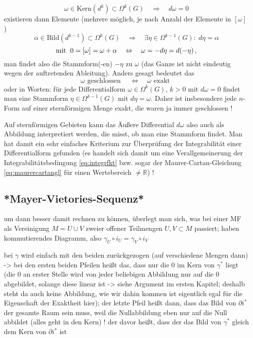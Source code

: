 \documentclass[../H_Analysis_main.tex]{subfiles}
\begin{document}
\begin{equation*}
\omega \in \text{Kern}(d^k) \subset \Omega^k(G) \quad \Rightarrow \quad d\omega = 0
\end{equation*}
existieren dann Elemente (mehrere möglich, je nach Anzahl der Elemente in $[\omega]$)
\begin{equation*}
\alpha \in \text{Bild}(d^{k - 1}) \subset \Omega^k(G) \quad \Rightarrow \quad \exists \eta \in \Omega^{k - 1}(G): \; d\eta = \alpha
\end{equation*}
\begin{equation*}
\text{mit } \; 0 = [\omega] = \omega + \alpha \quad \Leftrightarrow \quad \omega = -d\eta = d\qty(-\eta) \, ,
\end{equation*}
man findet also die Stammform(-en) $-\eta$ zu $\omega$ (das Ganze ist nicht eindeutig wegen der auftretenden Ableitung). Anders gesagt bedeutet das
\begin{equation}
\omega \text{ geschlossen } \quad \Leftrightarrow \quad \omega \text{ exakt }
\end{equation}
oder in Worten: für jede Differentialform $\omega \in \Omega^k(G), \, k > 0$ mit $d\omega = 0$ findet man eine Stammform $\eta \in \Omega^{k - 1}(G)$ mit $d\eta = \omega$. Daher ist insbesondere jede $n$-Form auf einer sternförmigen Menge exakt, die waren ja immer geschlossen !

Auf sternförmigen Gebieten kann das Äußere Differential $d\omega$ also auch als Abbildung interpretiert werden, die misst, ob man eine Stammform findet. Man hat damit ein sehr einfaches Kriterium zur Überprüfung der Integrabilität einer Differentialform gefunden (es handelt sich damit um eine Verallgemeinerung der Integrabilitätsbedingung \eqref{eq:integrfkt} bzw. sogar der Maurer-Cartan-Gleichung \eqref{eq:maurercartangl} für einen Wertebereich $\neq \mathbb{R}$) !



		\subsection{*Mayer-Vietories-Sequenz*}
um dann besser damit rechnen zu können, überlegt man sich, was bei einer MF als Vereinigung $M = U \cup V$ zweier offener Teilmengen $U, V \subset M$ passiert; haben kommutierendes Diagramm, also $\gamma_U \circ i_U = \gamma_V \circ i_V$

bei $\gamma$ wird einfach mit den beiden zurückgezogen (auf verschiedene Mengen dann) -> bei den ersten beiden Pfeilen heißt das, dass nur die 0 im Kern von $\gamma^*$ liegt (die 0 an erster Stelle wird von jeder beliebigen Abbildung nur auf die 0 abgebildet, solange diese linear ist -> siehe Argument im ersten Kapitel; deshalb steht da auch keine Abbildung, wie wir dahin kommen ist eigentlich egal für die Eigenschaft der Exaktheit hier); der letzte Pfeil heißt dann, dass das Bild von $\partial i^*$ der gesamte Raum sein muss, weil die Nullabbildung eben nur auf die Null abbildet (alles geht in den Kern) ! der davor heißt, dass der das Bild von $\gamma^*$ gleich dem Kern von $\partial i^*$ ist
\end{document}
